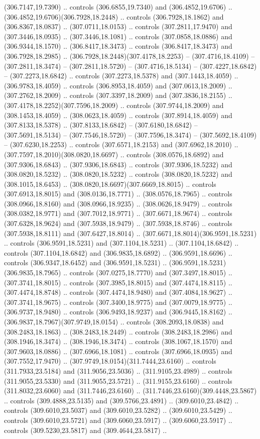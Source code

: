 (306.7147,19.7390) .. controls (306.6855,19.7340) and (306.4852,19.6706) .. (306.4852,19.6706)(306.7928,18.2448) .. controls (306.7928,18.1862) and (306.8367,18.0837) .. (307.0711,18.0153) .. controls (307.2811,17.9470) and (307.3446,18.0935) .. (307.3446,18.1081) .. controls (307.0858,18.0886) and (306.9344,18.1570) .. (306.8417,18.3473) .. controls (306.8417,18.3473) and (306.7928,18.2985) .. (306.7928,18.2448)(307.4178,18.2253) -- (307.4716,18.4109) -- (307.2811,18.3474) -- (307.2811,18.5720) -- (307.4716,18.5134) -- (307.4227,18.6842) -- (307.2273,18.6842) .. controls (307.2273,18.5378) and (307.1443,18.4059) .. (306.9783,18.4059) .. controls (306.8953,18.4059) and (307.0613,18.2009) .. (307.2762,18.2009) .. controls (307.3397,18.2009) and (307.3836,18.2155) .. (307.4178,18.2252)(307.7596,18.2009) .. controls (307.9744,18.2009) and (308.1453,18.4059) .. (308.0623,18.4059) .. controls (307.8914,18.4059) and (307.8133,18.5378) .. (307.8133,18.6842) -- (307.6180,18.6842) -- (307.5691,18.5134) -- (307.7546,18.5720) -- (307.7596,18.3474) -- (307.5692,18.4109) -- (307.6230,18.2253) .. controls (307.6571,18.2153) and (307.6962,18.2010) .. (307.7597,18.2010)(308.0820,18.6697) .. controls (308.0576,18.6892) and (307.9306,18.6843) .. (307.9306,18.6843) .. controls (307.9306,18.5232) and (308.0820,18.5232) .. (308.0820,18.5232) .. controls (308.0820,18.5232) and (308.1015,18.6453) .. (308.0820,18.6697)(307.6669,18.8015) .. controls (307.6913,18.8015) and (308.0136,18.7771) .. (308.0576,18.7965) .. controls (308.0966,18.8160) and (308.0966,18.9235) .. (308.0626,18.9479) .. controls (308.0382,18.9771) and (307.7012,18.9771) .. (307.6671,18.9674) .. controls (307.6328,18.9624) and (307.5938,18.9479) .. (307.5938,18.8746) .. controls (307.5938,18.8111) and (307.6427,18.8014) .. (307.6671,18.8014)(306.9591,18.5231) .. controls (306.9591,18.5231) and (307.1104,18.5231) .. (307.1104,18.6842) .. controls (307.1104,18.6842) and (306.9835,18.6892) .. (306.9591,18.6696) .. controls (306.9347,18.6452) and (306.9591,18.5231) .. (306.9591,18.5231)(306.9835,18.7965) .. controls (307.0275,18.7770) and (307.3497,18.8015) .. (307.3741,18.8015) .. controls (307.3985,18.8015) and (307.4474,18.8115) .. (307.4474,18.8748) .. controls (307.4474,18.9480) and (307.4084,18.9627) .. (307.3741,18.9675) .. controls (307.3400,18.9775) and (307.0079,18.9775) .. (306.9737,18.9480) .. controls (306.9493,18.9237) and (306.9445,18.8162) .. (306.9837,18.7967)(307.9749,18.0154) .. controls (308.2093,18.0838) and (308.2483,18.1863) .. (308.2483,18.2449) .. controls (308.2483,18.2986) and (308.1946,18.3474) .. (308.1946,18.3474) .. controls (308.1067,18.1570) and (307.9603,18.0886) .. (307.6966,18.1081) .. controls (307.6966,18.0935) and (307.7552,17.9470) .. (307.9749,18.0154)(311.7444,23.6160) .. controls (311.7933,23.5184) and (311.9056,23.5036) .. (311.9105,23.4989) .. controls (311.9055,23.5330) and (311.9055,23.5721) .. (311.9155,23.6160) .. controls (311.8032,23.6060) and (311.7446,23.6160) .. (311.7446,23.6160)(309.4448,23.5867) .. controls (309.4888,23.5135) and (309.5766,23.4891) .. (309.6010,23.4842) .. controls (309.6010,23.5037) and (309.6010,23.5282) .. (309.6010,23.5429) .. controls (309.6010,23.5721) and (309.6060,23.5917) .. (309.6060,23.5917) .. controls (309.5230,23.5817) and (309.4644,23.5817) .. 